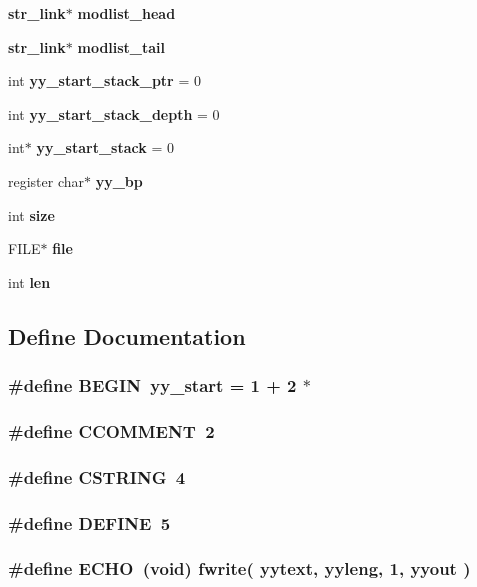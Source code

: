 \begin{CompactItemize}
{\bf str\_\-link}$\ast$ {\bf modlist\_\-head}
\item 
{\bf str\_\-link}$\ast$ {\bf modlist\_\-tail}
\item 
int {\bf yy\_\-start\_\-stack\_\-ptr} = 0
\item 
int {\bf yy\_\-start\_\-stack\_\-depth} = 0
\item 
int$\ast$ {\bf yy\_\-start\_\-stack} = 0
\item 
register char$\ast$ {\bf yy\_\-bp}
\item 
int {\bf size}
\item 
FILE$\ast$ {\bf file}
\item 
int {\bf len}
\end{CompactItemize}


\subsection{Define Documentation}
\subsubsection{\setlength{\rightskip}{0pt plus 5cm}\#define BEGIN\ yy\_\-start = 1 + 2 $\ast$}\label{lexer_8c_a24}


\subsubsection{\setlength{\rightskip}{0pt plus 5cm}\#define CCOMMENT\ 2}\label{lexer_8c_a59}


\subsubsection{\setlength{\rightskip}{0pt plus 5cm}\#define CSTRING\ 4}\label{lexer_8c_a61}


\subsubsection{\setlength{\rightskip}{0pt plus 5cm}\#define DEFINE\ 5}\label{lexer_8c_a62}


\subsubsection{\setlength{\rightskip}{0pt plus 5cm}\#define ECHO\ (void) fwrite( yytext, yyleng, 1, yyout )}\label{lexer_8c_a72}


